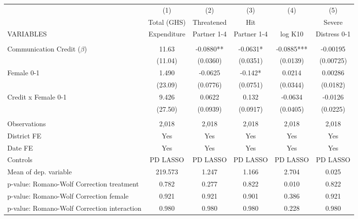 \begin{tabular}{lccccc} \hline
 & (1) & (2) & (3) & (4) & (5) \\
 & Total (GHS) & Threatened & Hit &  & Severe \\
VARIABLES & Expenditure & Partner 1-4 & Partner 1-4 & log K10 & Distress 0-1 \\ \hline
 &  &  &  &  &  \\
Communication Credit ($\beta$) & 11.63 & -0.0880** & -0.0631* & -0.0885*** & -0.00195 \\
 & (11.04) & (0.0360) & (0.0351) & (0.0139) & (0.00725) \\
Female 0-1 & 1.490 & -0.0625 & -0.142* & 0.0214 & 0.00286 \\
 & (23.09) & (0.0776) & (0.0751) & (0.0344) & (0.0182) \\
Credit x Female 0-1 & 9.426 & 0.0622 & 0.132 & -0.0634 & -0.0126 \\
 & (27.50) & (0.0939) & (0.0917) & (0.0405) & (0.0225) \\
 &  &  &  &  &  \\
Observations & 2,018 & 2,018 & 2,018 & 2,018 & 2,018 \\
District FE & Yes & Yes & Yes & Yes & Yes \\
Date FE & Yes & Yes & Yes & Yes & Yes \\
Controls & PD LASSO & PD LASSO & PD LASSO & PD LASSO & PD LASSO \\
Mean of dep. variable & 219.573 & 1.247 & 1.166 & 2.704 & 0.025 \\
p-value: Romano-Wolf Correction treatment & 0.782 & 0.277 & 0.822 & 0.010 & 0.822 \\
p-value: Romano-Wolf Correction female & 0.921 & 0.921 & 0.901 & 0.386 & 0.921 \\
 p-value: Romano-Wolf Correction interaction & 0.980 & 0.980 & 0.980 & 0.228 & 0.980 \\ \hline
\end{tabular}
